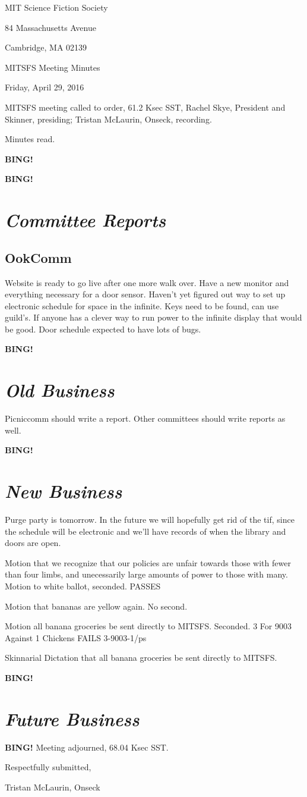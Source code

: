 \documentclass[10pt]{article}
\newcommand{\bing}{{\bf BING!} }
\newcommand{\goto}[1]{\bing \vskip 12pt \section*{{\em{#1}}}}
\newcommand{\skinner}{Rachel Skye, President and Skinner}
\newcommand{\onseck}{Tristan McLaurin, Onseck}
\newcommand{\meetingdate}{Friday, April 29, 2016}
\begin{document}
\begin{center}

MIT Science Fiction Society

84 Massachusetts Avenue

Cambridge, MA 02139

\vspace{12pt}

MITSFS Meeting Minutes

\meetingdate

\end{center}

\vspace{18pt}

\setlength{\parskip}{6pt}

\noindent
MITSFS meeting called to order, 61.2 Ksec SST,
\skinner, presiding; \onseck, recording.

Minutes read.

\bing

\goto{Committee Reports}
\subsection*{OokComm}
Website is ready to go live after one more walk over. Have a new monitor and everything necessary for a door sensor. Haven't yet figured out way to set up electronic schedule for space in the infinite. Keys need to be found, can use guild's. If anyone has a clever way to run power to the infinite display that would be good. Door schedule expected to have lots of bugs.


\goto{Old Business}
Picniccomm should write a report. Other committees should write reports as well.

\goto{New Business}
Purge party is tomorrow. In the future we will hopefully get rid of the tif, since the schedule will be electronic and we'll have records of when the library and doors are open.

Motion that we recognize that our policies are unfair towards those with fewer than four limbs, and unecessarily large amounts of power to those with many.
Motion to white ballot, seconded.
PASSES

Motion that bananas are yellow again. No second.

Motion all banana groceries be sent directly to MITSFS. Seconded.
3 For
9003 Against
1 Chickens
FAILS 3-9003-1/ps

Skinnarial Dictation that all banana groceries be sent directly to MITSFS.


\goto{Future Business}

\bing
\noindent
Meeting adjourned, 68.04 Ksec SST.

\vspace{18pt}

\centerline{Respectfully submitted,}
\centerline{\onseck}
\end{document}
